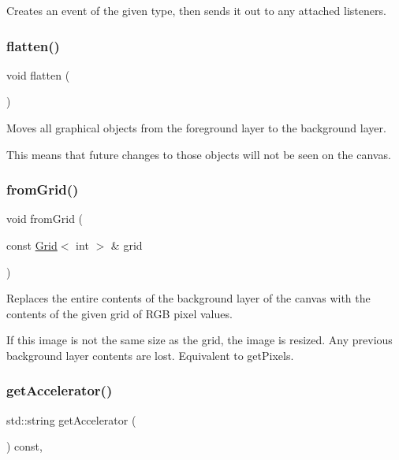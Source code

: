 Creates an event of the given type, then sends it out to any attached listeners. 

\mbox{\label{classGCanvas_a4c4590df33ce47ad8a42e06f9f44fc93}} 
\subsubsection{\texorpdfstring{flatten()}{flatten()}}
{\footnotesize\ttfamily void flatten (\begin{DoxyParamCaption}{ }\end{DoxyParamCaption})\hspace{0.3cm}{\ttfamily [virtual]}}



Moves all graphical objects from the foreground layer to the background layer. 

This means that future changes to those objects will not be seen on the canvas. \mbox{\label{classGCanvas_a46b18491b5230c765fbd9b8c7a095587}} 
\subsubsection{\texorpdfstring{from\+Grid()}{fromGrid()}}
{\footnotesize\ttfamily void from\+Grid (\begin{DoxyParamCaption}\item[{const \mbox{\hyperlink{classGrid}{Grid}}$<$ int $>$ \&}]{grid }\end{DoxyParamCaption})\hspace{0.3cm}{\ttfamily [virtual]}}



Replaces the entire contents of the background layer of the canvas with the contents of the given grid of R\+GB pixel values. 

If this image is not the same size as the grid, the image is resized. Any previous background layer contents are lost. Equivalent to get\+Pixels. \mbox{\label{classGInteractor_a69f8d23ed8f207fbecad99960776e942}} 
\subsubsection{\texorpdfstring{get\+Accelerator()}{getAccelerator()}}
{\footnotesize\ttfamily std\+::string get\+Accelerator (\begin{DoxyParamCaption}{ }\end{DoxyParamCaption}) const\hspace{0.3cm}{\ttfamily [virtual]}, {\ttfamily [inherited]}}



